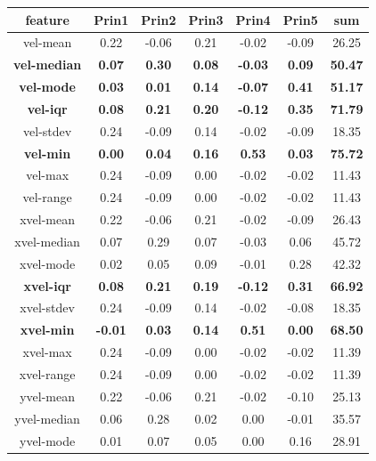 \iffalse
\begin{table}[h!]
	\centering
	\begin{tabular}{|c|c|c|c|c|c|c|}
		\hline
		\textbf{feature} & \textbf{Prin1} & \textbf{Prin2} & \textbf{Prin3} & \textbf{Prin4} & \textbf{Prin5} & \textbf{sum} \\
		\hline
		vel-mean & 0.22 & -0.06 & 0.21 & -0.02 & -0.09 & 26.25 \\
		\textbf{vel-median} & \textbf{0.07} & \textbf{0.30} & \textbf{0.08} & \textbf{-0.03} & \textbf{0.09} & \textbf{50.47} \\
		\textbf{vel-mode} & \textbf{0.03} & \textbf{0.01} & \textbf{0.14} & \textbf{-0.07} & \textbf{0.41} & \textbf{51.17} \\
		\textbf{vel-iqr} & \textbf{0.08} & \textbf{0.21} & \textbf{0.20} & \textbf{-0.12} & \textbf{0.35} & \textbf{71.79} \\
		vel-stdev & 0.24 & -0.09 & 0.14 & -0.02 & -0.09 & 18.35 \\
		\textbf{vel-min} & \textbf{0.00} & \textbf{0.04} & \textbf{0.16} & \textbf{0.53} & \textbf{0.03} & \textbf{75.72} \\
		vel-max & 0.24 & -0.09 & 0.00 & -0.02 & -0.02 & 11.43 \\
		vel-range & 0.24 & -0.09 & 0.00 & -0.02 & -0.02 & 11.43 \\
		xvel-mean & 0.22 & -0.06 & 0.21 & -0.02 & -0.09 & 26.43 \\
		xvel-median & 0.07 & 0.29 & 0.07 & -0.03 & 0.06 & 45.72 \\
		xvel-mode & 0.02 & 0.05 & 0.09 & -0.01 & 0.28 & 42.32 \\
		\textbf{xvel-iqr} & \textbf{0.08} & \textbf{0.21} & \textbf{0.19} & \textbf{-0.12} & \textbf{0.31} & \textbf{66.92} \\
		xvel-stdev & 0.24 & -0.09 & 0.14 & -0.02 & -0.08 & 18.35 \\
		\textbf{xvel-min} & \textbf{-0.01} & \textbf{0.03} & \textbf{0.14} & \textbf{0.51} & \textbf{0.00} & \textbf{68.50} \\
		xvel-max & 0.24 & -0.09 & 0.00 & -0.02 & -0.02 & 11.39 \\
		xvel-range & 0.24 & -0.09 & 0.00 & -0.02 & -0.02 & 11.39 \\
		yvel-mean & 0.22 & -0.06 & 0.21 & -0.02 & -0.10 & 25.13 \\
		yvel-median & 0.06 & 0.28 & 0.02 & 0.00 & -0.01 & 35.57 \\
		yvel-mode & 0.01 & 0.07 & 0.05 & 0.00 & 0.16 & 28.91 \\

\end{tabular}
\end{table}
